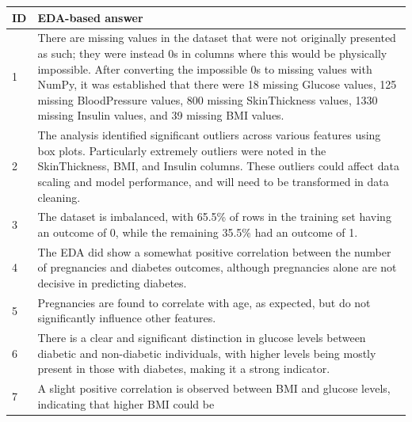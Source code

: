 \documentclass[12pt]{report}
\begin{document}
\begin{longtable}{ | p{} | p{} | }
    \hline
    \cellcolor{blue!25} ID & \cellcolor{blue!25} EDA-based answer \\
    \hline
    1 & There are missing values in the dataset that were not originally presented as such; they were instead
    0s in columns where this would be physically impossible. After converting the impossible 0s to missing values 
    with NumPy, it was established that there were 18 missing Glucose values, 125 missing BloodPressure values,
    800 missing SkinThickness values, 1330 missing Insulin values, and 39 missing BMI values.
    \\
    \hline
    2 & The analysis identified significant outliers across various features using box plots. 
    Particularly extremely outliers were noted in the SkinThickness, BMI, and Insulin columns. These outliers
    could affect data scaling and model performance, and will need to be transformed in data cleaning. \\
    \hline 
    3 & The dataset is imbalanced, with 65.5\% of rows in the training set having an outcome of 0, while the remaining 
    35.5\% had an outcome of 1.\\
    \hline 
    4 & The EDA did show a somewhat positive correlation between the number of pregnancies and diabetes outcomes, 
    although pregnancies alone are not decisive in predicting diabetes.\\
    \hline
    5 & Pregnancies are found to correlate with age, as expected, but do not significantly influence other features.\\
    \hline
    6 & There is a clear and significant distinction in glucose levels between diabetic and non-diabetic individuals,
    with higher levels being mostly present in those with diabetes, making it a strong indicator.\\
    \hline
    7 & A slight positive correlation is observed between BMI and glucose levels, indicating that higher BMI could be 

\end{longtable}
\end{document}
